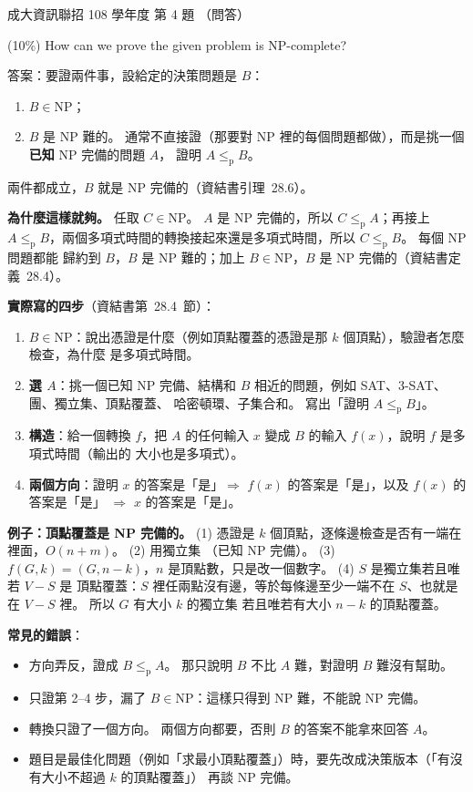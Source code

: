\begin{pastexam}[label={px:ncku-108-prog-04}]{成大資訊聯招 108 學年度 第 4 題}
（問答）

(10\%) How can we prove the given problem is NP-complete?
\end{pastexam}

\begin{pastsoln}
答案：要證兩件事，設給定的決策問題是 $B$：
\begin{enumerate}
\item $B \in \mathrm{NP}$；
\item $B$ 是 NP 難的。 通常不直接證（那要對 NP 裡的每個問題都做），而是挑一個\textbf{已知} NP 完備的問題 $A$，
證明 $A \le_{\mathrm{p}} B$。
\end{enumerate}
兩件都成立，$B$ 就是 NP 完備的（資結書引理~28.6）。

\textbf{為什麼這樣就夠。} 任取 $C \in \mathrm{NP}$。 $A$ 是 NP 完備的，所以 $C \le_{\mathrm{p}} A$；再接上
$A \le_{\mathrm{p}} B$，兩個多項式時間的轉換接起來還是多項式時間，所以 $C \le_{\mathrm{p}} B$。 每個 NP 問題都能
歸約到 $B$，$B$ 是 NP 難的；加上 $B \in \mathrm{NP}$，$B$ 是 NP 完備的（資結書定義~28.4）。

\textbf{實際寫的四步}（資結書第~28.4~節）：
\begin{enumerate}
\item \textbf{$B \in \mathrm{NP}$}：說出憑證是什麼（例如頂點覆蓋的憑證是那 $k$ 個頂點），驗證者怎麼檢查，為什麼
是多項式時間。
\item \textbf{選 $A$}：挑一個已知 NP 完備、結構和 $B$ 相近的問題，例如 SAT、3-SAT、團、獨立集、頂點覆蓋、
哈密頓環、子集合和。 寫出「證明 $A \le_{\mathrm{p}} B$」。
\item \textbf{構造}：給一個轉換 $f$，把 $A$ 的任何輸入 $x$ 變成 $B$ 的輸入 $f(x)$，說明 $f$ 是多項式時間（輸出的
大小也是多項式）。
\item \textbf{兩個方向}：證明 $x$ 的答案是「是」$\Rightarrow$ $f(x)$ 的答案是「是」，以及 $f(x)$ 的答案是「是」
$\Rightarrow$ $x$ 的答案是「是」。
\end{enumerate}

\textbf{例子：頂點覆蓋是 NP 完備的。} (1) 憑證是 $k$ 個頂點，逐條邊檢查是否有一端在裡面，$O(n + m)$。 (2) 用獨立集
（已知 NP 完備）。 (3) $f(G, k) = (G, n - k)$，$n$ 是頂點數，只是改一個數字。 (4) $S$ 是獨立集若且唯若 $V - S$ 是
頂點覆蓋：$S$ 裡任兩點沒有邊，等於每條邊至少一端不在 $S$、也就是在 $V - S$ 裡。 所以 $G$ 有大小 $k$ 的獨立集
若且唯若有大小 $n - k$ 的頂點覆蓋。

\textbf{常見的錯誤}：
\begin{itemize}
\item 方向弄反，證成 $B \le_{\mathrm{p}} A$。 那只說明 $B$ 不比 $A$ 難，對證明 $B$ 難沒有幫助。
\item 只證第 2--4 步，漏了 $B \in \mathrm{NP}$：這樣只得到 NP 難，不能說 NP 完備。
\item 轉換只證了一個方向。 兩個方向都要，否則 $B$ 的答案不能拿來回答 $A$。
\item 題目是最佳化問題（例如「求最小頂點覆蓋」）時，要先改成決策版本（「有沒有大小不超過 $k$ 的頂點覆蓋」）
再談 NP 完備。
\end{itemize}
\end{pastsoln}
